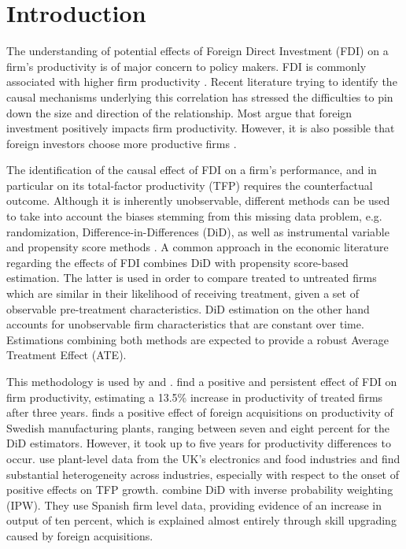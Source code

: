 \documentclass[a4paper,11pt]{scrartcl}
\begin{document}
\section{Introduction}

The understanding of potential effects of Foreign Direct Investment (FDI) on a firm's productivity is of major concern to policy makers. FDI is commonly associated with higher firm productivity \citep{girma2007}. 
Recent literature trying to identify the causal mechanisms underlying this correlation has stressed the difficulties to pin down the size and direction of the relationship. Most argue that foreign investment positively impacts firm productivity. However, it is also possible that foreign investors choose more productive firms \citep{arnold2009}.

The identification of the causal effect of FDI on a firm’s performance, and 
in particular on its total-factor productivity (TFP) requires the counterfactual outcome. Although it is inherently unobservable, different methods can be used to take into account the biases stemming from this missing data problem, e.g. randomization, Difference-in-Differences (DiD), as well as instrumental variable and propensity score methods \citep{karpaty2007}. A common approach in the economic literature regarding the effects of FDI combines DiD with propensity score-based estimation. The latter is used in order to compare treated to untreated firms which are similar in their likelihood of receiving treatment, given a set of observable pre-treatment characteristics. 
DiD estimation on the other hand accounts for unobservable firm characteristics that are constant over time. Estimations combining both methods are expected to provide a robust Average Treatment Effect (ATE). 

This methodology is used by \citet{arnold2009, karpaty2007, girma2007} and \citet{schiffbauer2017}. \citet{arnold2009}  find a positive and persistent effect of FDI on firm productivity, estimating a 13.5\% increase in productivity of treated firms after three years. \citet{karpaty2007} finds a positive effect of foreign acquisitions on productivity of Swedish manufacturing plants, ranging between seven and eight percent for the DiD estimators. However, it took up to five years for productivity differences to occur. 
\citet{girma2007} use plant-level data from the UK's electronics and food industries and find substantial heterogeneity across industries, especially with respect to the onset of positive effects on TFP growth.  \citet{koch2019} combine DiD with inverse probability weighting (IPW). They use Spanish firm level data, providing evidence of an increase in output of ten percent, which is explained almost entirely through skill upgrading caused by foreign acquisitions. 
\end{document}
